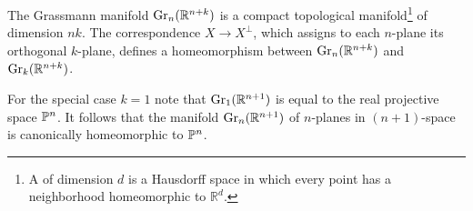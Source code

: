 \documentclass[../main]{subfiles}
\begin{document}
\begin{lemma}\label{lem:05.01}
	The Grassmann manifold $\operatorname{Gr}_n (\mathbb{R}^{n+k})$ is a compact topological manifold\footnote{ A  of dimension $d$ is a Hausdorff space in which every
		point has a neighborhood homeomorphic to $\mathbb{R}^d$.} of dimension $nk$. The correspondence $X \rightarrow X^{\perp}$, which assigns to each $n$-plane its orthogonal $k$-plane, defines a homeomorphism between $\operatorname{Gr}_n (\mathbb{R}^{n+k})$ and $\operatorname{Gr}_{k}(\mathbb{R}^{n+k})$.
\end{lemma}
\begin{remark*}
	For the special case $k=1$ note that $\operatorname{Gr}_{1}(\mathbb{R}^{n+1})$ is equal to the real projective space $\mathbb{P}^n$. It follows that the manifold $\operatorname{Gr}_{n}(\mathbb{R}^{n+1})$ of $n$-planes in $(n+1)$-space is canonically homeomorphic to $\mathbb{P}^n$.
\end{remark*}
\end{document}
